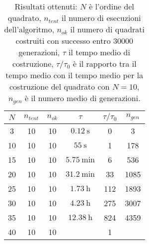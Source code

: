 \documentclass[italian,twoside,twocolumn]{article}
\begin{document}
\begin{table}[htbp]
	\centering
	\caption{Risultati ottenuti: $ N $ è l'ordine del quadrato, $ n_{tent} $ il numero di esecuzioni dell'algoritmo, $ n_{ok} $ il numero di quadrati costruiti con successo entro $ \num{30000} $ generazioni, $ \tau $ il tempo medio di costruzione, $ \tau \slash \tau_0 $ è il rapporto tra il tempo medio con il tempo medio per la costruzione del quadrato con $ N = 10 $, $ n_{gen} $ è il numero medio di generazioni.}
\begin{tabular}{c|ccccc}
	\hline
	$ N $ & $ n_{tent} $ & $ n_{ok} $ &        $ \tau $        & $ \tau \slash \tau_0 $ & $ n_{gen} $ \\ \hline
	  3   &      10      &     10     & $ \SI{0.12}{\second} $ &           0            &      3      \\
	 10   &      10      &     10     &  $ \SI{55}{\second} $  &           1            &     178     \\
	 15   &      10      &     10     & $ \SI{5.75}{\minute} $ &           6            &     536     \\
	 20   &      10      &     10     & $ \SI{31.2}{\minute} $ &           33           &    1085     \\
	 25   &      10      &     10     &  $ \SI{1.73}{\hour} $  &          112           &    1893     \\
	 30   &      10      &     10     &  $ \SI{4.23}{\hour} $  &          275           &    3007     \\
	 35   &      10      &     10     & $ \SI{12.38}{\hour} $  &          824           &    4359     \\
	 40   &      10      &     10     &                        &           1            &  \\ \hline 
\end{tabular} 
\label{tab:risultati_xie_kang}
\end{table}
\end{document}
